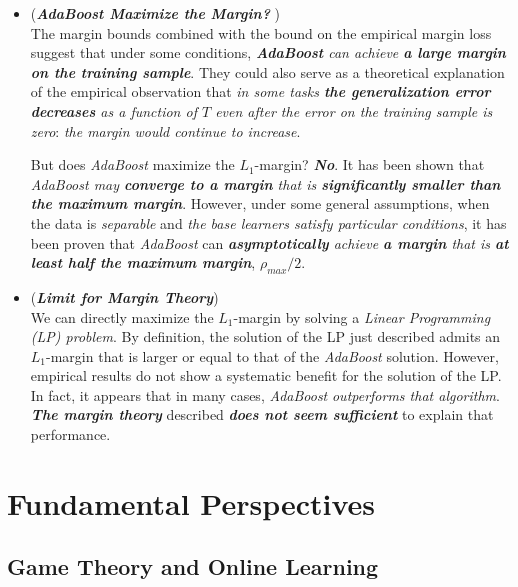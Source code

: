 \documentclass[11pt]{article}
\begin{document}
\begin{itemize}
\item \begin{remark} (\emph{\textbf{AdaBoost Maximize the Margin? }})\\
The margin bounds combined with the bound on the empirical margin loss suggest that under some conditions, \emph{\textbf{AdaBoost} can achieve \textbf{a large margin on the training sample}}. They could also serve as a theoretical explanation of the empirical observation that \emph{in some tasks \textbf{the generalization error decreases} as a function of $T$ even after the error on the training sample is zero}: \emph{the margin would continue to increase}. 

But does \emph{AdaBoost} maximize the $L_1$-margin? \emph{\textbf{No}}. It has been shown that \emph{AdaBoost may \textbf{converge to a margin} that is \textbf{significantly smaller than the maximum margin}}. However, under some general assumptions, when the data is \emph{separable} and \emph{the base learners satisfy particular conditions}, it has been proven that \emph{AdaBoost} can \emph{\textbf{asymptotically} achieve \textbf{a margin} that is \textbf{at least half the maximum margin}}, $\rho_{max}/2$.
\end{remark}

\item \begin{remark} (\emph{\textbf{Limit for Margin Theory}})\\
We can directly maximize the $L_1$-margin by solving a \emph{Linear Programming (LP) problem}. By definition, the solution of the LP just described admits an $L_1$-margin that is larger or equal to that of the \emph{AdaBoost} solution. However, empirical results do not show a systematic benefit for the solution of the LP. In fact, it appears that in many cases, \emph{AdaBoost} \emph{outperforms that algorithm}.  \emph{\textbf{The margin theory}} described \emph{\textbf{does not seem sufficient}} to explain that performance.
\end{remark}
\end{itemize}
\section{Fundamental Perspectives}
\subsection{Game Theory and Online Learning}
\end{document}
